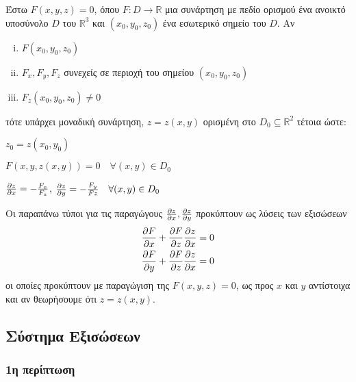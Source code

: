 Έστω $ F(x,y,z) = 0 $, όπου $F\colon D \to \mathbb{R}$ μια συνάρτηση με πεδίο ορισμού 
ένα ανοικτό υποσύνολο $ D $ του $ \mathbb{R}^{3}  $ και $ (x_0,y_0,z_0) $ ένα 
εσωτερικό σημείο του $ D $. Αν
\begin{enumerate}[(i)]
    \item $ F(x_0,y_0,z_0) $
    \item $ F_x, F_y, F_z $ συνεχείς σε περιοχή του σημείου $ (x_0,y_0,z_0) $
    \item $ F_z(x_0,y_0,z_0) \neq 0 $
\end{enumerate}
τότε υπάρχει μοναδική συνάρτηση, $ z=z(x,y) $ ορισμένη στο 
$ D_0 \subseteq \mathbb{R}^{2} $ τέτοια ώστε:
\begin{myitemize}
    \item $ z_0 = z(x_0,y_0) $
    \item $ F(x,y,z(x,y)) = 0  \quad \forall (x,y)\in  D_0 $
    \item $ \pdv{z}{x} = - \frac{F_x}{F_z} $, $ \pdv{z}{y} = - \frac{F_y}{Fz}\quad 
        \forall (x,y) \in D_0$
\end{myitemize}

\begin{rem}
    Οι παραπάνω τύποι για τις παραγώγους $ \pdv{z}{x}, \pdv{z}{y} $ προκύπτουν 
    ως λύσεις των εξισώσεων  
    \begin{align*}	
    \pdv{F}{x} + \pdv{F}{z}\pdv{z}{x} &= 0 \\
    \pdv{F}{y} + \pdv{F}{z}\pdv{z}{x} &= 0 
\end{align*}
οι οποίες προκύπτουν με παραγώγιση της $ F(x,y,z) = 0 $, ως προς $x$ και $y$ 
αντίστοιχα και  αν θεωρήσουμε ότι $ z=z(x,y) $.

\end{rem}

\subsection{Σύστημα Εξισώσεων}

\subsubsection{1η περίπτωση}

